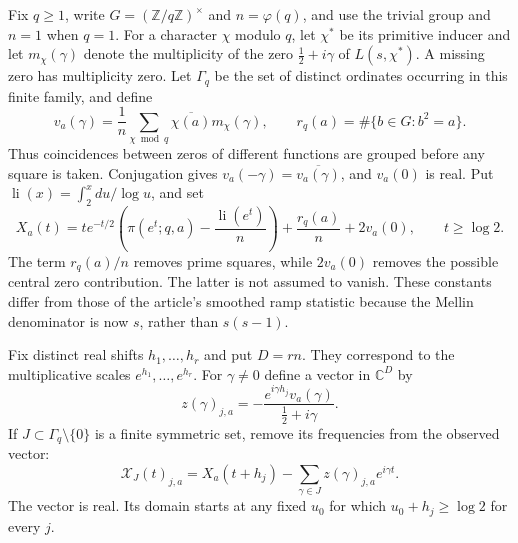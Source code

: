 Fix $q\geq1$, write $G=(\mathbb Z/q\mathbb Z)^\times$ and
$n=\varphi(q)$, and use the trivial group and $n=1$ when $q=1$.
For a character $\chi$ modulo $q$, let $\chi^*$ be its primitive inducer and
let $m_\chi(\gamma)$ denote the multiplicity of the zero
$\tfrac12+i\gamma$ of $L(s,\chi^*)$.  A missing zero has multiplicity zero.
Let $\Gamma_q$ be the set of distinct ordinates occurring in this finite
family, and define
\begin{equation}
\label{eq:pf-v}
 v_a(\gamma)=\frac1n\sum_{\chi\bmod q}
       \overline{\chi(a)}m_\chi(\gamma),
 \qquad
 r_q(a)=\#\{b\in G:b^2=a\}.
\end{equation}
Thus coincidences between zeros of different functions are grouped before
any square is taken.  Conjugation gives
$v_a(-\gamma)=\overline{v_a(\gamma)}$, and $v_a(0)$ is real.
Put $\operatorname{li}(x)=\int_2^x du/\log u$, and set
\begin{equation}
\label{eq:pf-X}
 X_a(t)=t e^{-t/2}
   \left(\pi(e^t;q,a)-\frac{\operatorname{li}(e^t)}n\right)
       +\frac{r_q(a)}n+2v_a(0),\qquad t\geq\log2.
\end{equation}
The term $r_q(a)/n$ removes prime squares, while $2v_a(0)$ removes the
possible central zero contribution.  The latter is not assumed to vanish.
These constants differ from those of the article's smoothed ramp statistic
because the Mellin denominator is now $s$, rather than $s(s-1)$.

Fix distinct real shifts $h_1,\ldots,h_r$ and put $D=rn$.
They correspond to the multiplicative scales $e^{h_1},\ldots,e^{h_r}$.
For $\gamma\ne0$ define a vector in $\mathbb C^D$ by
\begin{equation}
\label{eq:pf-z}
 z(\gamma)_{j,a}
       =-\frac{e^{i\gamma h_j}v_a(\gamma)}{\tfrac12+i\gamma}.
\end{equation}
If $J\subset\Gamma_q\setminus\{0\}$ is a finite symmetric set, remove its
frequencies from the observed vector:
\begin{equation}
\label{eq:pf-deletion}
 \mathcal X_J(t)_{j,a}
       =X_a(t+h_j)-\sum_{\gamma\in J}
                         z(\gamma)_{j,a}e^{i\gamma t}.
\end{equation}
The vector is real.  Its domain starts at any fixed $u_0$ for which
$u_0+h_j\geq\log2$ for every $j$.

